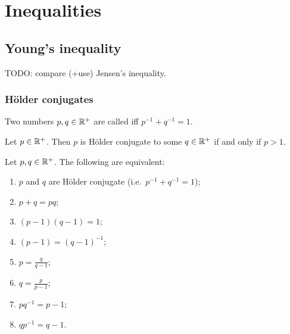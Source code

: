 \section{Inequalities}

\subsection{Young's inequality}
TODO: compare (+use) Jensen's inequality.

\subsubsection{Hölder conjugates}
\begin{definition}
Two numbers $p,q\in \mathbb{R}^+$ are called  iff $p^{-1} + q^{-1} = 1$.
\end{definition}

\begin{lemma}
Let $p\in \mathbb{R}^+$. Then $p$ is Hölder conjugate to some $q\in \mathbb{R}^+$ \textup{if and only if} $p > 1$.
\end{lemma}

\begin{lemma} \label{HoelderConjugateEquivalents}
Let $p,q\in \mathbb{R}^+$. The following are equivalent:
\begin{enumerate}
\item $p$ and $q$ are Hölder conjugate (i.e.\ $p^{-1}+q^{-1} = 1$);
\item $p+q = pq$;
\item $(p-1)(q-1) = 1$;
\item $(p-1) = (q-1)^{-1}$;
\item $p = \frac{q}{q-1}$;
\item $q = \frac{p}{p-1}$;
\item $pq^{-1} = p-1$;
\item $qp^{-1} = q-1$.
\end{enumerate}
\end{lemma}

